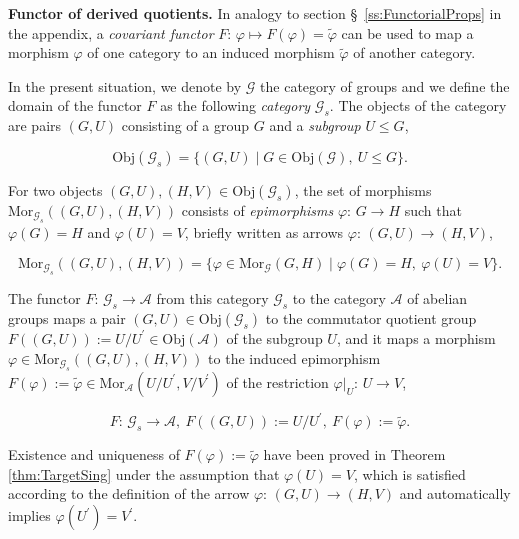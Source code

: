 \documentclass{amsart}
\theoremstyle{definition}
\numberwithin{equation}{section}
\begin{document}
\noindent
\textbf{Functor of derived quotients.}
In analogy to section \S\
\ref{ss:FunctorialProps}
in the appendix,
a \textit{covariant functor}
\(F:\,\varphi\mapsto F(\varphi)=\tilde{\varphi}\)
can be used to map a morphism \(\varphi\) of one category
to an induced morphism \(\tilde{\varphi}\) of another category.

In the present situation,
we denote by \(\mathcal{G}\) the category of groups and
we define the domain of the functor \(F\) as the following \textit{category} \(\mathcal{G}_s\).
The objects of the category are pairs \((G,U)\)
consisting of a group \(G\) and a \textit{subgroup} \(U\le G\),

\begin{equation}
\label{eqn:ObjGSub}
\mathrm{Obj}(\mathcal{G}_s)=\lbrace (G,U)\mid G\in\mathrm{Obj}(\mathcal{G}),\ U\le G\rbrace.
\end{equation}

\noindent
For two objects \((G,U),(H,V)\in\mathrm{Obj}(\mathcal{G}_s)\),
the set of morphisms \(\mathrm{Mor}_{\mathcal{G}_s}((G,U),(H,V))\)
consists of \textit{epimorphisms} \(\varphi:\,G\to H\) such that \(\varphi(G)=H\) and \(\varphi(U)=V\),
briefly written as arrows \(\varphi:\,(G,U)\to (H,V)\),

\begin{equation}
\label{eqn:MorGSub}
\mathrm{Mor}_{\mathcal{G}_s}((G,U),(H,V))=\lbrace\varphi\in\mathrm{Mor}_{\mathcal{G}}(G,H)\mid\varphi(G)=H,\ \varphi(U)=V\rbrace.
\end{equation}

\noindent
The functor \(F:\,\mathcal{G}_s\to\mathcal{A}\)
from this category \(\mathcal{G}_s\) to the category \(\mathcal{A}\) of abelian groups
maps a pair \((G,U)\in\mathrm{Obj}(\mathcal{G}_s)\) 
to the commutator quotient group \(F((G,U)):=U/U^\prime\in\mathrm{Obj}(\mathcal{A})\) of the subgroup \(U\),
and it maps a morphism \(\varphi\in\mathrm{Mor}_{\mathcal{G}_s}((G,U),(H,V))\)
to the induced epimorphism \(F(\varphi):=\tilde{\varphi}\in\mathrm{Mor}_{\mathcal{A}}(U/U^\prime,V/V^\prime)\)
of the restriction \(\varphi\vert_U:\,U\to V\),

\begin{equation}
\label{eqn:FunctorGSub}
F:\,\mathcal{G}_s\to\mathcal{A},\ F((G,U)):=U/U^\prime,\ F(\varphi):=\tilde{\varphi}.
\end{equation}

\noindent
Existence and uniqueness of \(F(\varphi):=\tilde{\varphi}\) have been proved in Theorem
\ref{thm:TargetSing}
under the assumption that \(\varphi(U)=V\),
which is satisfied according to the definition of the arrow \(\varphi:\,(G,U)\to (H,V)\)
and automatically implies \(\varphi(U^\prime)=V^\prime\).
\end{document}
